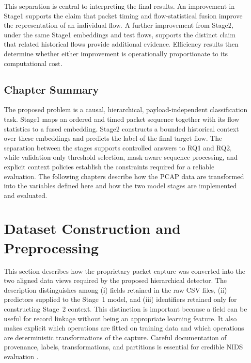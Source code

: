 \documentclass[11pt,fleqn]{report}
\begin{document}
This separation is central to interpreting the final results. An improvement in
Stage1 supports the claim that packet timing and flow-statistical fusion improve
the representation of an individual flow. A further improvement from Stage2,
under the same Stage1 embeddings and test flows, supports the distinct claim
that related historical flows provide additional evidence. Efficiency results
then determine whether either improvement is operationally proportionate to its
computational cost.

\section{Chapter Summary}
\label{subsec:problem_summary}

The proposed problem is a causal, hierarchical, payload-independent
classification task. Stage1 maps an ordered and timed packet sequence together
with its flow statistics to a fused embedding. Stage2 constructs a bounded
historical context over these embeddings and predicts the label of the final
target flow. The separation between the stages supports controlled answers to
RQ1 and RQ2, while validation-only threshold selection, mask-aware sequence
processing, and explicit context policies establish the constraints required
for a reliable evaluation. The following chapters describe how the PCAP data
are transformed into the variables defined here and how the two model stages
are implemented and evaluated.

%

\providecommand{\datasetfield}[1]{\texttt{\detokenize{#1}}}


\chapter{Dataset Construction and Preprocessing}
\label{sec:dataset_preprocessing}

This section describes how the proprietary packet capture was converted into
the two aligned data views required by the proposed hierarchical detector. The
description distinguishes among (i) fields retained in the raw CSV files,
(ii) predictors supplied to the Stage~1 model, and (iii) identifiers retained
only for constructing Stage~2 context. This distinction is important because a
field can be useful for record linkage without being an appropriate learning
feature. It also makes explicit which operations are fitted on training data
and which operations are deterministic transformations of the capture.
Careful documentation of provenance, labels, transformations, and partitions
is essential for credible NIDS evaluation
\cite{Shiravi2012DatasetGeneration,Ring2019Datasets,Goldschmidt2025Datasets,
Pinto2025DatasetReview}.
\end{document}
